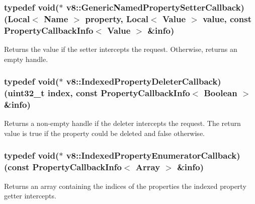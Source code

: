\subsubsection[{\texorpdfstring{Generic\+Named\+Property\+Setter\+Callback}{GenericNamedPropertySetterCallback}}]{\setlength{\rightskip}{0pt plus 5cm}typedef void($\ast$ v8\+::\+Generic\+Named\+Property\+Setter\+Callback) ({\bf Local}$<$ {\bf Name} $>$ property, {\bf Local}$<$ {\bf Value} $>$ value, const {\bf Property\+Callback\+Info}$<$ {\bf Value} $>$ \&info)}\hypertarget{namespacev8_af74716c6e95a269c6cd4314662fd0a7e}{}\label{namespacev8_af74716c6e95a269c6cd4314662fd0a7e}
Returns the value if the setter intercepts the request. Otherwise, returns an empty handle. 
\subsubsection[{\texorpdfstring{Indexed\+Property\+Deleter\+Callback}{IndexedPropertyDeleterCallback}}]{\setlength{\rightskip}{0pt plus 5cm}typedef void($\ast$ v8\+::\+Indexed\+Property\+Deleter\+Callback) (uint32\+\_\+t index, const {\bf Property\+Callback\+Info}$<$ {\bf Boolean} $>$ \&info)}\hypertarget{namespacev8_a53863728de14cde48dd6543207b2f2da}{}\label{namespacev8_a53863728de14cde48dd6543207b2f2da}
Returns a non-\/empty handle if the deleter intercepts the request. The return value is true if the property could be deleted and false otherwise. 
\subsubsection[{\texorpdfstring{Indexed\+Property\+Enumerator\+Callback}{IndexedPropertyEnumeratorCallback}}]{\setlength{\rightskip}{0pt plus 5cm}typedef void($\ast$ v8\+::\+Indexed\+Property\+Enumerator\+Callback) (const {\bf Property\+Callback\+Info}$<$ {\bf Array} $>$ \&info)}\hypertarget{namespacev8_adbb0a6d5537371953f9ba807d4f6275e}{}\label{namespacev8_adbb0a6d5537371953f9ba807d4f6275e}
Returns an array containing the indices of the properties the indexed property getter intercepts. 
